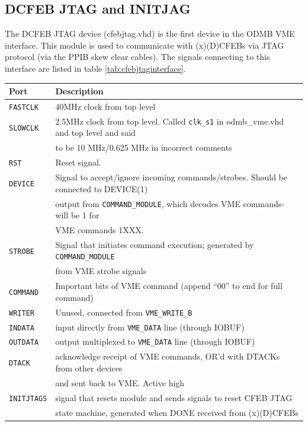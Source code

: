 \documentclass[10pt,a4paper]{article}
\begin{document}
\subsection{DCFEB JTAG and INITJAG}

The DCFEB JTAG device (cfebjtag.vhd) is the first device in the ODMB VME interface. This module is used to communicate with (x)(D)CFEBs via JTAG protocol (via the PPIB skew clear cables). The signals connecting to this interface are listed in table \ref{tab:cfebjtaginterface}.

\begin{table}[H]
\begin{tabular}{|l|l|} \hline
Port& Description\\ \hline
\texttt{FASTCLK}& 40MHz clock from top level\\ \hline
\texttt{SLOWCLK}& 2.5MHz clock from top level. Called \texttt{clk\_s1} in odmb\_vme.vhd and top level and said \\
       &to be 10 MHz/0.625 MHz in incorrect comments\\ \hline
\texttt{RST}& Reset signal.\\ \hline
\texttt{DEVICE}& Signal to accept/ignore incoming commands/strobes. Should be connected to DEVICE(1) \\
      & output from \texttt{COMMAND\_MODULE}, which decodes VME commands- will be 1 for \\
			& VME commands 1XXX.\\ \hline 
\texttt{STROBE}& Signal that initiates command execution; generated by \texttt{COMMAND\_MODULE} \\
      & from VME strobe signals\\ \hline
\texttt{COMMAND}& Important bits of VME command (append ``00'' to end for full command)\\ \hline
\texttt{WRITER}& Unused, connected from \texttt{VME\_WRITE\_B}\\ \hline
\texttt{INDATA}& input directly from \texttt{VME\_DATA} line (through IOBUF)\\ \hline
\texttt{OUTDATA}& output multiplexed to \texttt{VME\_DATA} line (through IOBUF)\\ \hline
\texttt{DTACK}& acknowledge receipt of VME commands, OR'd with DTACKs from other devices \\
     & and sent back to VME. Active high\\ \hline
\texttt{INITJTAGS}& signal that resets module and sends signals to reset CFEB JTAG \\
         & state machine, generated when DONE received from (x)(D)CFEBs\\ \hline

\end{tabular}
\end{table}
\end{document}
